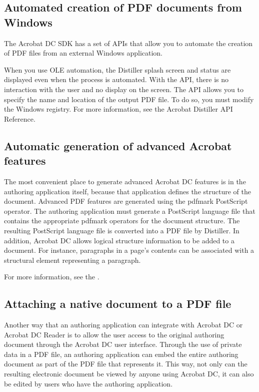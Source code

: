 \documentclass[letterpaper,12pt,english,openany,oneside]{sphinxmanual}
\begin{document}
\subsection{Automated creation of PDF documents from Windows}
\label{\detokenize{Overview_PDFCreation:automated-creation-of-pdf-documents-from-windows}}
The Acrobat DC SDK has a set of APIs that allow you to automate the creation of PDF files from an external Windows application.

When you use OLE automation, the Distiller splash screen and status are displayed even when the process is automated. With the API, there is no interaction with the user and no display on the screen. The API allows you to specify the name and location of the output PDF file. To do so, you must modify the Windows registry. For more information, see the Acrobat Distiller API Reference.




\subsection{Automatic generation of advanced Acrobat features}
\label{\detokenize{Overview_PDFCreation:automatic-generation-of-advanced-acrobat-features}}
The most convenient place to generate advanced Acrobat DC features is in the authoring application itself, because that application defines the structure of the document. Advanced PDF features are generated using the pdfmark PostScript operator. The authoring application must generate a PostScript language file that contains the appropriate pdfmark operators for the document structure. The resulting PostScript language file is converted into a PDF file by Distiller. In addition, Acrobat DC allows logical structure information to be added to a document. For instance, paragraphs in a page’s contents can be associated with a structural element representing a paragraph.

For more information, see the  .




\subsection{Attaching a native document to a PDF file}
\label{\detokenize{Overview_PDFCreation:attaching-a-native-document-to-a-pdf-file}}
Another way that an authoring application can integrate with Acrobat DC or Acrobat DC Reader is to allow the user access to the original authoring document through the Acrobat DC user interface. Through the use of private data in a PDF file, an authoring application can embed the entire authoring document as part of the PDF file that represents it. This way, not only can the resulting electronic document be viewed by anyone using Acrobat DC, it can also be edited by users who have the authoring application.
\end{document}
